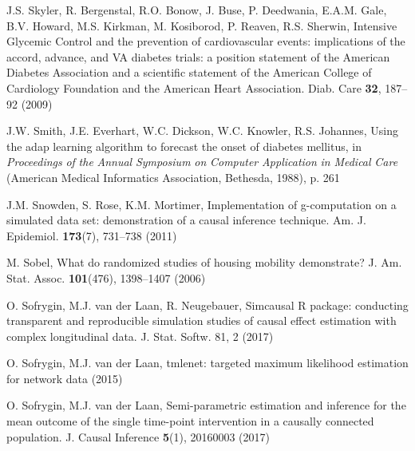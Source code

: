\begin{list}{}{\setlength{\leftmargin}{2.1em}\setlength{\labelwidth}{0pt}
  \setlength{\labelsep}{0pt}\setlength{\itemindent}{-2.1em}
  \setlength{\parsep}{0pt}\setlength{\itemsep}{2pt}\setlength{\topsep}{0pt}}
\item\label{refentry:REF362}J.S. Skyler, R. Bergenstal, R.O. Bonow, J. Buse, P. Deedwania, E.A.M. Gale, B.V. Howard, M.S. Kirkman, M. Kosiborod, P. Reaven, R.S. Sherwin, Intensive Glycemic Control and the prevention of cardiovascular events: implications of the accord, advance, and VA diabetes trials: a position statement of the American Diabetes Association and a scientific statement of the American College of Cardiology Foundation and the American Heart Association. Diab. Care \textbf{32}, 187--92 (2009)\label{refend:REF362}
\item\label{refentry:REF363}J.W. Smith, J.E. Everhart, W.C. Dickson, W.C. Knowler, R.S. Johannes, Using the adap learning algorithm to forecast the onset of diabetes mellitus, in \textit{Proceedings} \textit{of} \textit{the} \textit{Annual} \textit{Symposium} \textit{on} \textit{Computer} \textit{Application} \textit{in} \textit{Medical} \textit{Care} (American Medical Informatics Association, Bethesda, 1988), p. 261\label{refend:REF363}
\item\label{refentry:REF364}J.M. Snowden, S. Rose, K.M. Mortimer, Implementation of g-computation on a simulated data set: demonstration of a causal inference technique. Am. J. Epidemiol. \textbf{173}(7), 731--738 (2011)\label{refend:REF364}
\item\label{refentry:REF365}M. Sobel, What do randomized studies of housing mobility demonstrate? J. Am. Stat. Assoc. \textbf{101}(476), 1398--1407 (2006)\label{refend:REF365}
\item\label{refentry:REF366}O. Sofrygin, M.J. van der Laan, R. Neugebauer, Simcausal R package: conducting transparent and reproducible simulation studies of causal effect estimation with complex longitudinal data. J. Stat. Softw. 81, 2 (2017)\label{refend:REF366}
\item\label{refentry:REF367}O. Sofrygin, M.J. van der Laan, tmlenet: targeted maximum likelihood estimation for network data (2015)\label{refend:REF367}
\item\label{refentry:REF368}O. Sofrygin, M.J. van der Laan, Semi-parametric estimation and inference for the mean outcome of the single time-point intervention in a causally connected population. J. Causal Inference \textbf{5}(1), 20160003 (2017)\label{refend:REF368}

\end{list}
